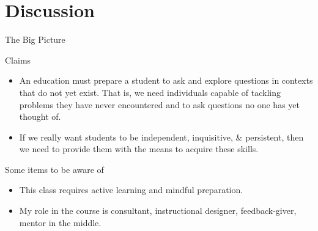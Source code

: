 \documentclass[10pt]{beamer}
\begin{document}

\section{Discussion}


\begin{frame}{The Big Picture}

\vspace{2em}

\begin{block}{Claims}
\vspace{-.75em}
\begin{itemize}
\item An education must prepare a student to ask and explore questions in contexts that do not yet exist. That is, we need individuals capable of tackling problems they have never encountered and to ask questions no one has yet thought of.
\item If we really want students to be independent, inquisitive, \& persistent, then we need to provide them with the means to acquire these skills.
\end{itemize}
\end{block}

\pause

\begin{block}{Some items to be aware of}
\vspace{-.75em}
\begin{itemize}
\item This class requires \alert{active learning} and \alert{mindful preparation}. 
\item My role in the course is \alert{consultant}, \alert{instructional designer}, \alert{feedback-giver}, \alert{mentor in the middle}. 
\end{itemize}
\end{block}


\end{frame}
\end{document}
